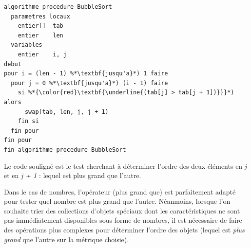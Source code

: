 \documentclass[11pt,a4paper]{article}
\begin{document}
\begin{center}
\begin{lstlisting}[style=algorithmique]
algorithme procedure BubbleSort
  parametres locaux
    entier[]  tab
    entier    len
  variables
    entier    i, j
debut
pour i = (len - 1) %*\textbf{jusqu'a}*) 1 faire
  pour j = 0 %*\textbf{jusqu'a}*) (i - 1) faire
    si %*{\color{red}\textbf{\underline{(tab[j] > tab[j + 1])}}}*) alors
      swap(tab, len, j, j + 1)
    fin si
  fin pour
fin pour
fin algorithme procedure BubbleSort \end{lstlisting}


\end{center}


Le code souligné  est le test cherchant à déterminer l'ordre des deux éléments en \textit{j} et en \textit{j + 1} : lequel est plus grand que l'autre.

\medskip

Dans le cas de nombres, l'opérateur \TTBF{>} (plus grand que) est parfaitement adapté pour tester quel nombre est plus grand que l'autre.
Néanmoins, lorsque l'on souhaite trier des collections d'objets spéciaux dont les caractéristiques ne sont pas immédiatement disponibles sous forme de nombres, il est nécessaire de faire des opérations plus complexes pour déterminer l'ordre des objets (lequel est \textit{plus grand} que l'autre sur la métrique choisie).
\end{document}
